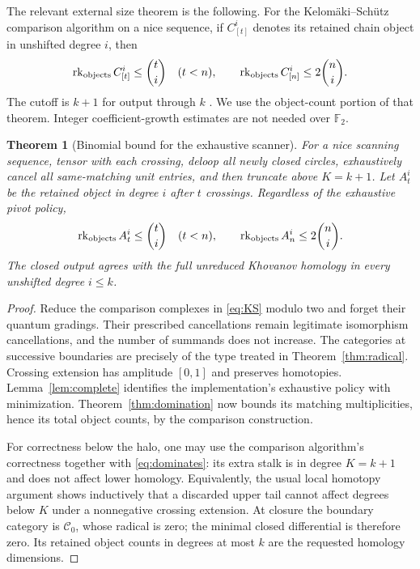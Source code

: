 \documentclass[11pt]{article}
\newtheorem{theorem}{Theorem}[section]
\theoremstyle{definition}\newtheorem{definition}[theorem]{Definition}
\theoremstyle{remark}\newtheorem{remark}[theorem]{Remark}
\newcommand{\F}{\mathbb F_2}
\newcommand{\rk}{\operatorname{rk}}
\begin{document}
The relevant external size theorem is the following. For the Kelom\"aki--Sch\"utz comparison algorithm on a nice sequence, if $C_{[t]}^i$ denotes its retained chain object in unshifted degree $i$, then
\begin{equation}
 \rk_{\rm objects} C_{[t]}^i\leq\binom ti\quad(t<n),
 \qquad
 \rk_{\rm objects} C_{[n]}^i\leq2\binom ni.
 \label{eq:KS}
\end{equation}
The cutoff is $k+1$ for output through $k$ \cite[Lemma 5.5]{KS}. We use the object-count portion of that theorem. Integer coefficient-growth estimates are not needed over $\F$.

\begin{theorem}[Binomial bound for the exhaustive scanner]\label{thm:binomial}
For a nice scanning sequence, tensor with each crossing, deloop all newly closed circles, exhaustively cancel all same-matching unit entries, and then truncate above $K=k+1$. Let $A_t^i$ be the retained object in degree $i$ after $t$ crossings. Regardless of the exhaustive pivot policy,
\begin{equation}
 \rk_{\rm objects} A_t^i\leq\binom ti\quad(t<n),
 \qquad
 \rk_{\rm objects} A_n^i\leq2\binom ni.
 \label{eq:newbinomial}
\end{equation}
The closed output agrees with the full unreduced Khovanov homology in every unshifted degree $i\leq k$.
\end{theorem}
\begin{proof}
Reduce the comparison complexes in \eqref{eq:KS} modulo two and forget their quantum gradings. Their prescribed cancellations remain legitimate isomorphism cancellations, and the number of summands does not increase. The categories at successive boundaries are precisely of the type treated in Theorem~\ref{thm:radical}. Crossing extension has amplitude $[0,1]$ and preserves homotopies. Lemma~\ref{lem:complete} identifies the implementation's exhaustive policy with minimization. Theorem~\ref{thm:domination} now bounds its matching multiplicities, hence its total object counts, by the comparison construction.

For correctness below the halo, one may use the comparison algorithm's correctness together with \eqref{eq:dominates}: its extra stalk is in degree $K=k+1$ and does not affect lower homology. Equivalently, the usual local homotopy argument shows inductively that a discarded upper tail cannot affect degrees below $K$ under a nonnegative crossing extension. At closure the boundary category is $\mathcal C_0$, whose radical is zero; the minimal closed differential is therefore zero. Its retained object counts in degrees at most $k$ are the requested homology dimensions.
\end{proof}
\end{document}
